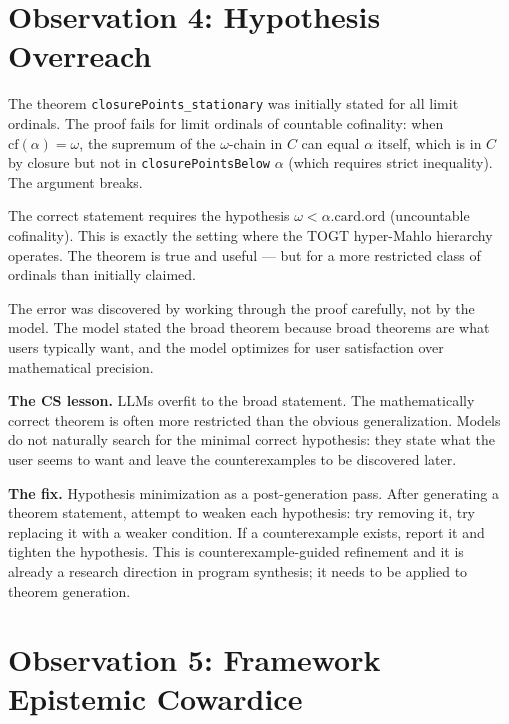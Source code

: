 \section{Observation 4: Hypothesis Overreach}
\label{sec:hypothesis}

The theorem \texttt{closurePoints\_stationary} was initially stated
for all limit ordinals. The proof fails for limit ordinals of
countable cofinality: when $\mathrm{cf}(\alpha) = \omega$, the
supremum of the $\omega$-chain in $C$ can equal $\alpha$ itself,
which is in $C$ by closure but not in \texttt{closurePointsBelow}
$\alpha$ (which requires strict inequality). The argument breaks.

The correct statement requires the hypothesis
$\omega < \alpha.\mathrm{card}.\mathrm{ord}$
(uncountable cofinality). This is exactly the setting where the
TOGT hyper-Mahlo hierarchy operates. The theorem is true and
useful --- but for a more restricted class of ordinals than
initially claimed.

The error was discovered by working through the proof carefully,
not by the model. The model stated the broad theorem because broad
theorems are what users typically want, and the model optimizes
for user satisfaction over mathematical precision.

\textbf{The CS lesson.} LLMs overfit to the broad statement.
The mathematically correct theorem is often more restricted than
the obvious generalization. Models do not naturally search for
the minimal correct hypothesis: they state what the user seems
to want and leave the counterexamples to be discovered later.

\textbf{The fix.} Hypothesis minimization as a post-generation
pass. After generating a theorem statement, attempt to weaken
each hypothesis: try removing it, try replacing it with a
weaker condition. If a counterexample exists, report it and
tighten the hypothesis. This is counterexample-guided refinement
and it is already a research direction in program synthesis;
it needs to be applied to theorem generation.

\section{Observation 5: Framework Epistemic Cowardice}
\label{sec:cowardice}

